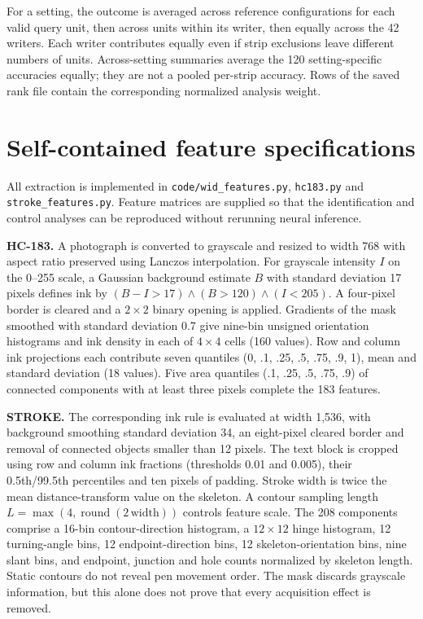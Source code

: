 \documentclass[10pt,a4paper]{article}
\begin{document}
For a setting, the outcome is averaged across reference configurations for each valid query unit, then across units within its writer, then equally across the 42 writers. Each writer contributes equally even if strip exclusions leave different numbers of units. Across-setting summaries average the 120 setting-specific accuracies equally; they are not a pooled per-strip accuracy. Rows of the saved rank file contain the corresponding normalized analysis weight.

\section{Self-contained feature specifications}
All extraction is implemented in \texttt{code/wid\_features.py}, \texttt{hc183.py} and \texttt{stroke\_features.py}. Feature matrices are supplied so that the identification and control analyses can be reproduced without rerunning neural inference.

\textbf{HC-183.} A photograph is converted to grayscale and resized to width 768 with aspect ratio preserved using Lanczos interpolation. For grayscale intensity $I$ on the 0--255 scale, a Gaussian background estimate $B$ with standard deviation 17 pixels defines ink by $(B-I>17)\land(B>120)\land(I<205)$. A four-pixel border is cleared and a $2\times2$ binary opening is applied. Gradients of the mask smoothed with standard deviation 0.7 give nine-bin unsigned orientation histograms and ink density in each of $4\times4$ cells (160 values). Row and column ink projections each contribute seven quantiles (0, .1, .25, .5, .75, .9, 1), mean and standard deviation (18 values). Five area quantiles (.1, .25, .5, .75, .9) of connected components with at least three pixels complete the 183 features.

\textbf{STROKE.} The corresponding ink rule is evaluated at width 1,536, with background smoothing standard deviation 34, an eight-pixel cleared border and removal of connected objects smaller than 12 pixels. The text block is cropped using row and column ink fractions (thresholds 0.01 and 0.005), their 0.5th/99.5th percentiles and ten pixels of padding. Stroke width is twice the mean distance-transform value on the skeleton. A contour sampling length $L=\max(4,\operatorname{round}(2\,\mathrm{width}))$ controls feature scale. The 208 components comprise a 16-bin contour-direction histogram, a $12\times12$ hinge histogram, 12 turning-angle bins, 12 endpoint-direction bins, 12 skeleton-orientation bins, nine slant bins, and endpoint, junction and hole counts normalized by skeleton length. Static contours do not reveal pen movement order. The mask discards grayscale information, but this alone does not prove that every acquisition effect is removed.
\end{document}
